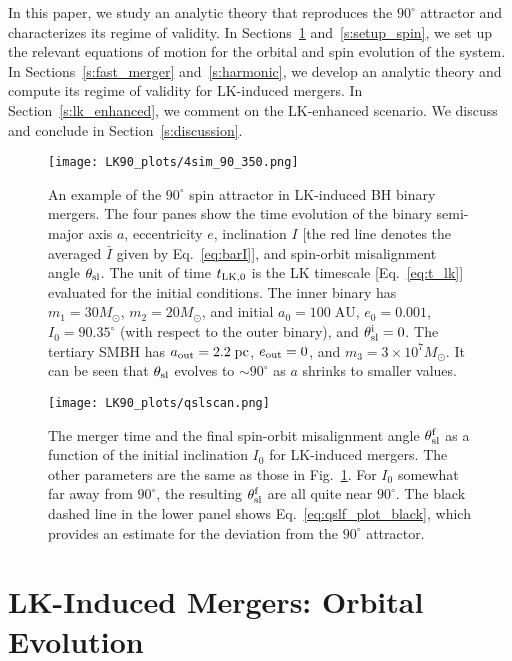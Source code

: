 \documentclass[
        twocolumn,
        twocolappendix
    ]{aastex63}
\begin{document}
In this paper, we study an analytic theory that reproduces the $90^\circ$
attractor and characterizes its regime of validity. In
Sections~\ref{s:setup_orbital} and~\ref{s:setup_spin}, we set up the relevant
equations of motion for the orbital and spin evolution of the system. In
Sections~\ref{s:fast_merger} and~\ref{s:harmonic}, we develop an analytic theory
and compute its regime of validity for LK-induced mergers. In
Section~\ref{s:lk_enhanced}, we comment on the LK-enhanced scenario. We discuss
and conclude in Section~\ref{s:discussion}.

\begin{figure}
    \centering
    \texttt{[image: LK90\_plots/4sim\_90\_350.png]}
    \caption{An example of the $90^\circ$ spin attractor in LK-induced BH binary
    mergers. The four panes show the time evolution of the binary semi-major
    axis $a$, eccentricity $e$, inclination $I$ [the red line denotes the
    averaged $\bar{I}$ given by Eq.~\eqref{eq:barI}], and spin-orbit
    misalignment angle $\theta_{\rm sl}$. The unit of time $t_{\rm LK, 0}$ is
    the LK timescale [Eq.~\eqref{eq:t_lk}] evaluated for the initial conditions.
    The inner binary has $m_1 = 30M_{\odot}$, $m_2 = 20M_{\odot}$, and initial
    $a_0 = 100\;\mathrm{AU}$, $e_0 = 0.001$, $I_0 = 90.35^\circ$ (with respect
    to the outer binary), and $\theta_{\rm sl}^{\rm i} = 0$. The tertiary SMBH
    has $a_{\rm out} = 2.2\;\mathrm{pc}$, $e_{\rm out} = 0$, and $m_3 = 3 \times
    10^7 M_{\odot}$. It can be seen that $\theta_{\rm sl}$ evolves to $\sim
    90^\circ$ as $a$ shrinks to smaller values.}\label{fig:4sim_90_350}
\end{figure}
\begin{figure}
    \centering
    \texttt{[image: LK90\_plots/qslscan.png]}
    \caption{The merger time and the final spin-orbit misalignment angle
    $\theta_{\rm sl}^{\rm f}$ as a function of the initial inclination $I_0$ for
    LK-induced mergers. The other parameters are the same as those in
    Fig.~\ref{fig:4sim_90_350}. For $I_0$ somewhat far away from $90^\circ$, the
    resulting $\theta_{\rm sl}^{\rm f}$ are all quite near $90^\circ$. The black
    dashed line in the lower panel shows Eq.~\eqref{eq:qslf_plot_black}, which
    provides an estimate for the deviation from the $90^\circ$
    attractor.}\label{fig:qslscan}
\end{figure}

\section{LK-Induced Mergers: Orbital Evolution}\label{s:setup_orbital}
\end{document}
